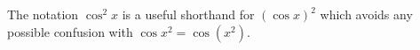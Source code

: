 The notation $\cos^{2}x$ is a useful shorthand for $\left ( \cos x \right )^2$ which avoids any possible confusion with $\cos x^2=\cos(x^2)$. 